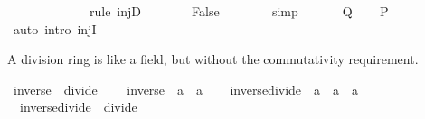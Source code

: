 \begin{isabellebody}
\ \isamarkupfalse%
\ {\isachardoublequoteopen}{}\ {\isacharequal}{\kern0pt}\ {}{\isachardoublequoteclose}\isanewline
\ \ \ \ \ \ \isamarkupfalse%
\ {\isacharparenleft}{\kern0pt}rule\ injD{\isacharparenright}{\kern0pt}\isanewline
\ \ \ \ \isamarkupfalse%
\ \isamarkupfalse%
\ False\isanewline
\ \ \ \ \ \ \isamarkupfalse%
\ simp\isanewline
\ \ \isamarkupfalse%
\isanewline
{}\isamarkupfalse%
\isanewline
\ \ \isamarkupfalse%
\ {\isacharquery}{\kern0pt}Q\ \isamarkupfalse%
\ \isamarkupfalse%
\ {\isacharquery}{\kern0pt}P\isanewline
\ \ \ \ \isamarkupfalse%
\ {\isacharparenleft}{\kern0pt}auto\ intro{\isacharcolon}{\kern0pt}\ injI{\isacharparenright}{\kern0pt}\isanewline
{}\isamarkupfalse%
%
\endisatagproof
{\isafoldproof}%
%
\isadelimproof
\isanewline
%
\endisadelimproof
\isanewline
{}\isamarkupfalse%
%
\isadelimdocument
%
\endisadelimdocument
%
\isatagdocument
%
\isamarkuptrue%
%
\endisatagdocument
{\isafolddocument}%
%
\isadelimdocument
%
\endisadelimdocument
%
\begin{isamarkuptext}%
A division ring is like a field, but without the commutativity requirement.%
\end{isamarkuptext}\isamarkuptrue%
\isamarkupfalse%
\ inverse\ {\isacharequal}{\kern0pt}\ divide\ {\isacharplus}{\kern0pt}\isanewline
\ \ \ inverse\ {\isacharcolon}{\kern0pt}{\isacharcolon}{\kern0pt}\ {\isachardoublequoteopen}{\isacharprime}{\kern0pt}a\ {\isasymRightarrow}\ {\isacharprime}{\kern0pt}a{\isachardoublequoteclose}\isanewline
{}\isanewline
\ \ \isanewline
{}\isamarkupfalse%
\ inverse{\isacharunderscore}{\kern0pt}divide\ {\isacharcolon}{\kern0pt}{\isacharcolon}{\kern0pt}\ {\isachardoublequoteopen}{\isacharprime}{\kern0pt}a\ {\isasymRightarrow}\ {\isacharprime}{\kern0pt}a\ {\isasymRightarrow}\ {\isacharprime}{\kern0pt}a{\isachardoublequoteclose}\ \ {\isacharparenleft}{\kern0pt}\ {\isachardoublequoteopen}{\isacharprime}{\kern0pt}{\isacharslash}{\kern0pt}{\isachardoublequoteclose}\ {}{}{\isacharparenright}{\kern0pt}\isanewline
{}\isanewline
\ \ {\isachardoublequoteopen}inverse{\isacharunderscore}{\kern0pt}divide\ {\isasymequiv}\ divide{\isachardoublequoteclose}\isanewline
\isanewline
{}\isamarkupfalse%
%
\begin{isamarkuptext}%

\end{isamarkuptext}
\end{isabellebody}
